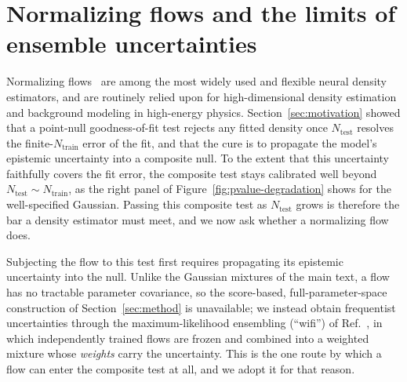 \section{Normalizing flows and the limits of ensemble uncertainties}
\label{app:nf}

Normalizing flows~\citep{NormalizingFlows} are among the most widely used and
flexible neural density estimators, and are routinely relied upon for
high-dimensional density estimation and background modeling in high-energy
physics. Section~\ref{sec:motivation} showed that a point-null goodness-of-fit test
rejects any fitted density once $N_{\mathrm{test}}$ resolves the
finite-$N_{\mathrm{train}}$ error of the fit, and that the cure is to propagate the
model's epistemic uncertainty into a composite null. To the extent that this
uncertainty faithfully covers the fit error, the composite test stays calibrated
well beyond $N_{\mathrm{test}}\!\sim\!N_{\mathrm{train}}$, as the right panel of
Figure~\ref{fig:pvalue-degradation} shows for the well-specified Gaussian. Passing
this composite test as $N_{\mathrm{test}}$ grows is therefore the bar a density
estimator must meet, and we now ask whether a normalizing flow does.

Subjecting the flow to this test first requires propagating its epistemic
uncertainty into the null. Unlike the Gaussian mixtures of the main text, a flow
has no tractable parameter covariance, so the score-based, full-parameter-space
construction of Section~\ref{sec:method} is unavailable; we instead obtain
frequentist uncertainties through the maximum-likelihood ensembling (``wifi'') of
Ref.~\citep{Sean}, in which independently trained flows are frozen and combined
into a weighted mixture whose \emph{weights} carry the uncertainty. This is the
one route by which a flow can enter the composite test at all, and we adopt it for
that reason.

